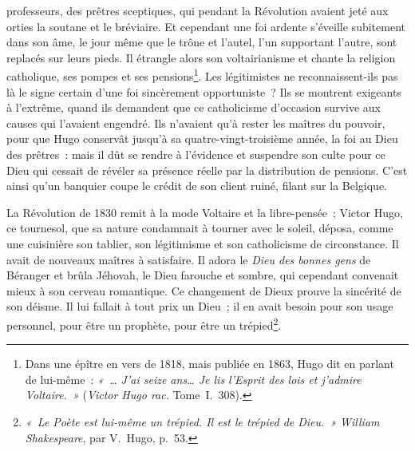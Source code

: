 \documentclass[french,twoside]{book} %
\begin{document}
\label{p48}professeurs, des prêtres sceptiques, qui pendant la Révolution avaient jeté aux orties la soutane et le bréviaire. Et cependant une foi ardente s’éveille subitement dans son âme, le jour même que le trône et l’autel, l’un supportant l’autre, sont replacés sur leurs pieds. Il étrangle alors son voltairianisme et chante la religion catholique, ses pompes et ses pensions\footnote{Dans une épître en vers de 1818, mais publiée en 1863, Hugo dit en parlant de lui-même : \emph{« … J’ai seize ans… Je lis l’Esprit des lois et j’admire Voltaire. »} (\emph{Victor Hugo rac.} Tome I. 308).}. Les légitimistes ne reconnaissent-ils pas là le signe certain d’une foi sincèrement opportuniste ? Ils se montrent exigeants à l’extrême, quand ils demandent que ce catholicisme d’occasion survive aux causes qui l’avaient engendré. Ils n’avaient qu’à rester les maîtres du pouvoir, pour que Hugo conservât jusqu’à sa quatre-vingt-troisième année, la foi au Dieu des prêtres : mais il dût se rendre à l’évidence et suspendre son culte pour ce Dieu qui cessait de révéler sa présence réelle par la distribution de pensions. C’est ainsi qu’un banquier coupe le crédit de son client ruiné, filant sur la Belgique.\par
La Révolution de 1830 remit à la mode Voltaire et la libre-pensée ; Victor Hugo, ce tournesol, que sa nature condamnait à tourner avec le soleil, déposa, comme une cuisinière son tablier, son légitimisme et son catholicisme de circonstance. Il avait de nouveaux maîtres à satisfaire. Il adora le \emph{Dieu des bonnes gens} de Béranger et brûla Jéhovah, le Dieu farouche et sombre, qui cependant  
\label{p49}convenait mieux à son cerveau romantique. Ce changement de Dieux prouve la sincérité de son déisme. Il lui fallait à tout prix un Dieu ; il en avait besoin pour son usage personnel, pour être un prophète, pour être un trépied\footnote{\emph{« Le Poète est lui-même un trépied. Il est le trépied de Dieu. »} \emph{William Shakespeare}, par V. Hugo, p. 53.}.\par
\end{document}
